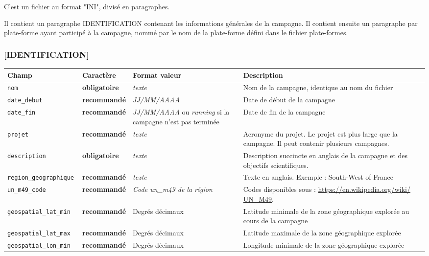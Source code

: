 C'est un fichier au format "INI", divisé en paragraphes.

Il contient un paragraphe IDENTIFICATION contenant les informations générales
de la campagne.
Il contient ensuite un paragraphe par plate-forme ayant participé à la campagne, nommé par le nom de la 
plate-forme défini dans le fichier plate-formes.

\subsubsection{[IDENTIFICATION]}

\saute
\noindent\begin{tabular}{|p{4.3cm}|p{2.2cm}|p{3.9cm}|p{5.5cm}|}
\hline 
Champ& Caractère& Format valeur& Description \\
\hline 
\hline 
\texttt{nom}& \textbf{obligatoire} & \textit{texte}& Nom de la campagne, identique au nom du fichier\\
\hline 
\texttt{date\_debut}& \textbf{recommandé} & \textit{JJ/MM/AAAA} & Date de début de la campagne\\
\hline 
\texttt{date\_fin }& \textbf{recommandé} & \textit{JJ/MM/AAAA} ou \textit{running} si la  campagne n'est pas terminée & Date de fin de la campagne \\
\hline 
\texttt{projet }& \textbf{recommandé} & \textit{texte} & Acronyme du projet. Le projet est plus large que la campagne. Il peut contenir plusieurs campagnes.\\
\hline 
\texttt{description }& \textbf{obligatoire} & \textit{texte} & Description succincte en anglais de la campagne et des objectifs scientifiques. \\
\hline
\texttt{region\_geographique }& \textbf{recommandé} & \textit{texte} & Texte en anglais. Exemple : South-West of France \\
\hline
\texttt{un\_m49\_code}& \textbf{recommandé} & \textit{Code un\_m49 de la région} & Codes disponibles sous : \href{https://en.wikipedia.org/wiki/UN_M49}{https://en.wikipedia.org/wiki/
UN\_M49}.\\
\hline 
\texttt{geospatial\_lat\_min }& \textbf{recommandé} & Degrés décimaux & Latitude minimale de la zone géographique explorée au cours de la campagne\\
\hline 
\texttt{geospatial\_lat\_max }& \textbf{recommandé} & Degrés décimaux & Latitude maximale de la zone géographique explorée \\
\hline 
\texttt{geospatial\_lon\_min }& \textbf{recommandé} & Degrés décimaux & Longitude minimale de la zone géographique explorée \\

\end{tabular}
